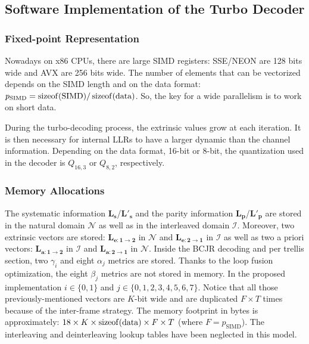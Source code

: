\subsection{Software Implementation of the Turbo Decoder}
\label{sec:opt_turbo_implem}


\subsubsection{Fixed-point Representation}

Nowadays on x86 CPUs, there are large SIMD registers: SSE/NEON are 128 bits
wide and AVX are 256 bits wide. The number of elements that can be vectorized
depends on the SIMD length and on the data format:
$p_\text{SIMD} = \operatorname*{sizeof}(\text{SIMD}) / \operatorname*{sizeof}(\text{data})$. So, the key for a
wide parallelism is to work on short data.

During the turbo-decoding process, the extrinsic values grow at each iteration.
It is then necessary for internal LLRs to have a larger dynamic than the channel
information. Depending on the data format, 16-bit or 8-bit, the quantization
used in the decoder is $Q_{16,3}$ or $Q_{8,2}$, respectively.

\subsubsection{Memory Allocations}

The systematic information $\bm{L_s}$/$\bm{L'_s}$ and the parity information
$\bm{L_p}$/$\bm{L'_p}$ are stored in the natural domain $\mathcal{N}$ as well as
in the interleaved domain $\mathcal{I}$. Moreover, two extrinsic vectors are
stored: $\bm{L_{e:1 \rightarrow 2}}$ in $\mathcal{N}$ and
$\bm{L_{e:2 \rightarrow 1}}$ in $\mathcal{I}$ as well as two a priori vectors:
$\bm{L_{a:1 \rightarrow 2}}$ in $\mathcal{I}$ and
$\bm{L_{a:2 \rightarrow 1}}$ in $\mathcal{N}$. Inside the BCJR decoding and per
trellis section, two $\gamma_{i}$ and eight $\alpha_{j}$ metrics are stored.
Thanks to the loop fusion optimization, the eight $\beta_j$ metrics are not
stored in memory. In the proposed implementation $i \in \{0,1\}$ and $j \in
\{0,1,2,3,4,5,6,7\}$. Notice that all those previously-mentioned vectors are
$K$-bit wide and are duplicated $F\times T$ times because of the inter-frame
strategy. The memory footprint in bytes is approximately: $18 \times K \times
\operatorname*{sizeof}(\text{data}) \times F \times T$ (where $F = p_\text{SIMD}$). The
interleaving and deinterleaving lookup tables have been neglected in this model.

